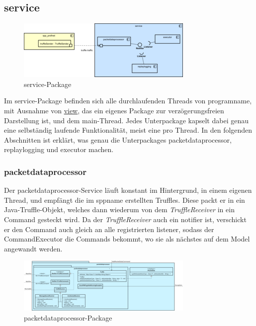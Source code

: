 \subsection{service}
\label{subsec:service}

\begin{figure}[H]
  \centering
  \includegraphics[width=\textwidth]{../diagramimages/service.png}
  \caption{service-Package}
\end{figure}

\medskip
Im service-Package befinden sich alle durchlaufenden Threads von \gls{programname},
mit Ausnahme von \hyperref[subsec:view]{view}, das ein eigenes Package zur verzögerungsfreien Darstellung ist, und dem
main-Thread. Jedes Unterpackage kapselt dabei genau eine selbständig laufende Funktionalität, meist eine pro Thread. In den folgenden Abschnitten ist erklärt, was genau die Unterpackages packetdataprocessor, replaylogging und executor machen.

    \subsubsection{packetdataprocessor}
    \label{subsubsec:truffleprocessor}

    Der packetdataprocessor-Service läuft konstant im Hintergrund, in einem eigenen Thread,
    und empfängt die im \gls{sppname} erstellten Truffles.
    Diese packt er in ein Java-Truffle-Objekt, welches dann wiederum von dem
    \textit{TruffleReceiver} in ein Command gesteckt wird. Da der \textit{TruffleReceiver}
    auch ein \gls{notifier} ist, verschickt er den Command auch gleich an
    alle registrierten \gls{listener}, sodass der CommandExecutor die Commands bekommt, wo sie
    als nächstes auf dem Model angewandt werden.

    \clearpage
    \begin{figure}
      \centering
      \includegraphics[width=\textwidth]{../diagramimages/packetdataprocessor.png}
      \caption{packetdataprocessor-Package}
    \end{figure}
    \clearpage


